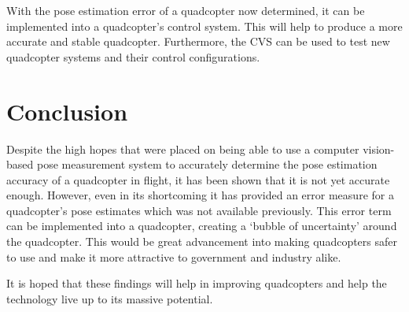 With the pose estimation error of a quadcopter now determined, it can be implemented into a quadcopter's control system. This will help to produce a more accurate and stable quadcopter. Furthermore, the CVS can be used to test new quadcopter systems and their control configurations. 

\section{Conclusion}

Despite the high hopes that were placed on being able to use a computer vision-based pose measurement system to accurately determine the pose estimation accuracy of a quadcopter in flight, it has been shown that it is not yet accurate enough. However, even in its shortcoming it has provided an error measure for a quadcopter's pose estimates which was not available previously. This error term can be implemented into a quadcopter, creating a `bubble of uncertainty' around the quadcopter. This would be great advancement into making quadcopters safer to use and make it more attractive to government and industry alike. 

It is hoped that these findings will help in improving quadcopters and help the technology live up to its massive potential. 
